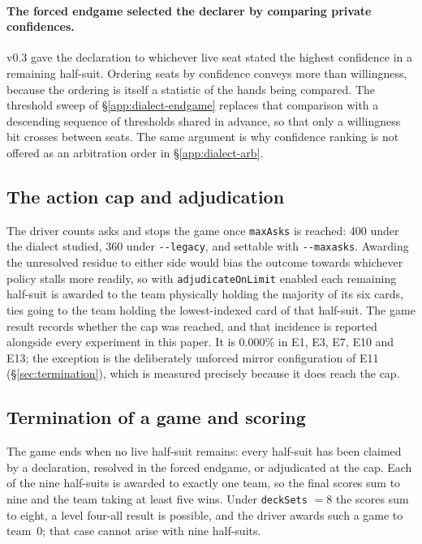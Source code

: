 \documentclass[11pt]{article}
\theoremstyle{definition}
\newcommand{\numLimitRate}{0.000\%}
\begin{document}
\paragraph{The forced endgame selected the declarer by comparing private
confidences.} v0.3 gave the declaration to whichever live seat stated the
highest confidence in a remaining half-suit. Ordering seats by confidence
conveys more than willingness, because the ordering is itself a statistic of the
hands being compared. The threshold sweep of \S\ref{app:dialect-endgame}
replaces that comparison with a descending sequence of thresholds shared in
advance, so that only a willingness bit crosses between seats. The same argument
is why confidence ranking is not offered as an arbitration order in
\S\ref{app:dialect-arb}.

\subsection{The action cap and adjudication}

The driver counts asks and stops the game once \texttt{maxAsks} is reached: 400
under the dialect studied, 360 under \texttt{-{}-legacy}, and settable with
\texttt{-{}-maxasks}. Awarding the unresolved residue to either side would bias
the outcome towards whichever policy stalls more readily, so with
\texttt{adjudicateOnLimit} enabled each remaining half-suit is awarded to the
team physically holding the majority of its six cards, ties going to the team
holding the lowest-indexed card of that half-suit. The game result records
whether the cap was reached, and that incidence is reported alongside every
experiment in this paper. It is \numLimitRate{} in E1, E3, E7, E10 and E13; the
exception is the deliberately unforced mirror configuration of E11
(\S\ref{sec:termination}), which is measured precisely because it does reach the
cap.

\subsection{Termination of a game and scoring}

The game ends when no live half-suit remains: every half-suit has been claimed
by a declaration, resolved in the forced endgame, or adjudicated at the cap.
Each of the nine half-suits is awarded to exactly one team, so the final scores
sum to nine and the team taking at least five wins. Under \texttt{deckSets} $=8$
the scores sum to eight, a level four-all result is possible, and the driver
awards such a game to team~0; that case cannot arise with nine half-suits.
\end{document}
